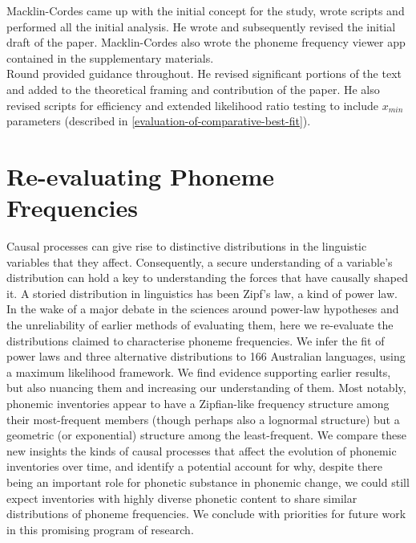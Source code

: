 \noindent
Macklin-Cordes came up with the initial concept for the study, wrote scripts and performed all the initial analysis. He wrote and subsequently revised the initial draft of the paper. Macklin-Cordes also wrote the phoneme frequency viewer app contained in the supplementary materials.\\

\noindent
Round provided guidance throughout. He revised significant portions of the text and added to the theoretical framing and contribution of the paper. He also revised scripts for efficiency and extended likelihood ratio testing to include $x_{min}$ parameters (described in \ref{evaluation-of-comparative-best-fit}).


\chapter[Re-evaluating phoneme frequencies]{Re-evaluating Phoneme Frequencies}
\label{ch-phon-freqs}	%
\pagestyle{headings}

Causal processes can give rise to distinctive distributions in the linguistic variables that they affect. Consequently, a secure understanding of a variable's distribution can hold a key to understanding the forces that have causally shaped it. A storied distribution in linguistics has been Zipf's law, a kind of power law. In the wake of a major debate in the sciences around power-law hypotheses and the unreliability of earlier methods of evaluating them, here we re-evaluate the distributions claimed to characterise phoneme frequencies. We infer the fit of power laws and three alternative distributions to 166 Australian languages, using a maximum likelihood framework. We find evidence supporting earlier results, but also nuancing them and increasing our understanding of them. Most notably, phonemic inventories appear to have a Zipfian-like frequency structure among their most-frequent members (though perhaps also a lognormal structure) but a geometric (or exponential) structure among the least-frequent. We compare these new insights the kinds of causal processes that affect the evolution of phonemic inventories over time, and identify a potential account for why, despite there being an important role for phonetic substance in phonemic change, we could still expect inventories with highly diverse phonetic content to share similar distributions of phoneme frequencies. We conclude with priorities for future work in this promising program of research.

